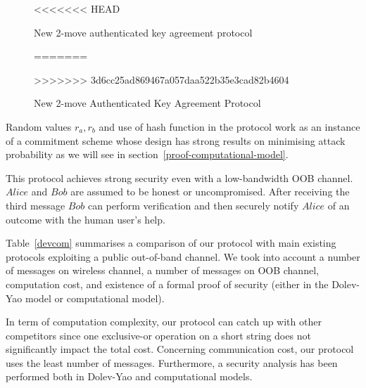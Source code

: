 \begin{enumerate}
\begin{enumerate}
\begin{figure}[b]
\begin{center}
\end{center}
<<<<<<< HEAD
\caption{New 2-move authenticated key agreement protocol} 
=======
\caption{New 2-move Authenticated Key Agreement Protocol} 
>>>>>>> 3d6cc25ad869467a057daa522b35e3cad82b4604
\label{improved-wong-stajano-protocol}
\end{figure}

Random values $r_a, r_b$ and use of hash function in the protocol work as an instance of a commitment scheme whose design has strong results on minimising attack probability as we will see in section~\ref{proof-computational-model}. 

This protocol achieves strong security even with a low-bandwidth OOB channel. $Alice$ and $Bob$ are assumed to be honest or uncompromised. After receiving the third message $Bob$ can perform verification and then securely notify $Alice$ of an outcome with the human user's help. 

Table~\ref{devcom} summarises a comparison of our protocol with main existing protocols exploiting a public out-of-band channel. We took into account a number of messages on wireless channel, a number of messages on OOB channel, computation cost, and existence of a formal proof of security (either in the Dolev-Yao model or computational model). 

In term of computation complexity, our protocol can catch up with other competitors since one exclusive-or operation on a short string does not significantly impact the total cost. Concerning communication cost, our protocol uses the least number of messages. Furthermore, a security 
analysis has been performed both in Dolev-Yao and computational models.


\end{enumerate}
\end{enumerate}
